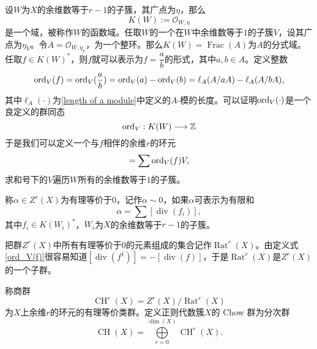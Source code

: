 \begin{example}
设$W$为$X$的余维数等于$r-1$的子簇，其广点为$\eta$，那么
\begin{equation}
K(W) := \mathcal{O}_{W,\eta}
\end{equation}
是一个域，被称作$W$的函数域。任取$W$的一个在$W$中余维数等于$1$的子簇$V$，设其广点为$\eta_V$。令$A = \mathcal{O}_{W,\eta_V}$，为一个整环。那么$K(W) = \operatorname{Frac}(A)$为$A$的分式域。任取$f\in K(W)^*$，则$f$就可以表示为$f = \dfrac{a}{b}$的形式，其中$a,b\in A$。定义整数
\begin{equation} \label{ord_V(f)}
\operatorname{ord}_V(f) = \operatorname{ord}_V(\dfrac{a}{b}) = \operatorname{ord}_V(a) - \operatorname{ord}_V(b) = \ell_{A}(A/aA) - \ell_{A}(A/bA),
\end{equation}
其中$\ell_A(\cdot)$为\ref{length of a module}中定义的$A$-模的长度。可以证明$\operatorname{ord}_V(\cdot)$是一个良定义的群同态
\begin{equation}
\operatorname{ord}_V: K(W) \longrightarrow \mathbb{Z}
\end{equation}
于是我们可以定义一个与$f$相伴的余维$r$的环元
\begin{equation}
[\operatorname{div}(f)] = \sum \ord_V(f) V,
\end{equation}
求和号下的$V$遍历$W$所有的余维数等于$1$的子簇。
\end{example}

\begin{definition}
称$\alpha \in Z^r(X)$为有理等价于$0$，记作$\alpha \sim 0$，如果$\alpha$可表示为有限和
\begin{equation}
\alpha = \sum [\operatorname{div}(f_i)],
\end{equation}
其中$f_i\in K(W_i)^*$，$W_i$为$X$的余维数等于$r-1$的子簇。
\end{definition}

把群$Z^r(X)$中所有有理等价于$0$的元素组成的集合记作$\operatorname{Rat}^r(X)$。由定义式\eqref{ord_V(f)}很容易知道$[\operatorname{div}(f^{1})] = -[\operatorname{div}(f)]$，于是$\operatorname{Rat}^r(X)$是$Z^r(X)$的一个子群。

\begin{definition}
称商群
\begin{equation}
\operatorname{CH}^r(X) = Z^r(X) / \operatorname{Rat}^r(X)
\end{equation}
为$X$上余维$r$的环元的有理等价类群。定义正则代数簇$X$的 Chow 群为分次群
\begin{equation}
\operatorname{CH}(X) = \bigoplus\limits_{r=0}^{\dim(X)} \operatorname{CH}^r(X).
\end{equation}
\end{definition}

